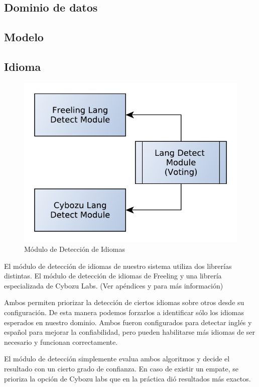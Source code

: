 \bigskip
\subsection{Dominio de datos}
\subsection{Modelo}

\subsection{Idioma}

\begin{figure}
  \centering
    \includegraphics[scale=0.5]{graficos/LangDetect}
  \caption{Módulo de Detección de Idiomas}
  \label{fig:LangDetect}
\end{figure}

El módulo de detección de idiomas de nuestro sistema utiliza dos librerías distintas.
El módulo de detección de idiomas de Freeling y una librería especializada de Cybozu Labs. (Ver apéndices  y  para más información)

Ambos permiten priorizar la detección de ciertos idiomas sobre otros desde su configuración.
De esta manera podemos forzarlos a identificar sólo los idiomas esperados en nuestro dominio. 
Ambos fueron configurados para detectar inglés y español para mejorar la confiabilidad,
pero pueden habilitarse más idiomas de ser necesario y funcionan correctamente. 

El módulo de detección simplemente evalua ambos algoritmos y 
decide el resultado con un cierto grado de confianza. En caso de existir un empate, se 
prioriza la opción de Cybozu labs que en la práctica dió resultados más exactos.


